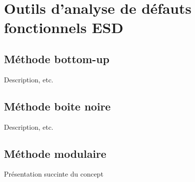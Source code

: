 \chapter{Outils d'analyse de défauts fonctionnels ESD}

\section{Méthode bottom-up}

Description, etc.

\section{Méthode boite noire}

Description, etc.

\section{Méthode modulaire}

Présentation succinte du concept
